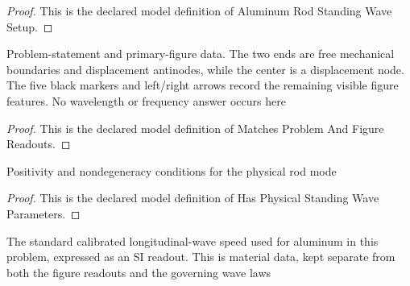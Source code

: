 \begin{proof}
  This is the declared model definition of Aluminum Rod Standing Wave Setup.
\end{proof}
\begin{definition}
  \label{def:physics:phyx-mini-0185:phyxminiproblems-problemphyxmini0185-matchesproblemandfigurereadouts}
  Problem-statement and primary-figure data. The two ends are free mechanical boundaries and displacement antinodes, while the center is a displacement node. The five black markers and left/right arrows record the remaining visible figure features. No wavelength or frequency answer occurs here
\end{definition}
\begin{proof}
  This is the declared model definition of Matches Problem And Figure Readouts.
\end{proof}
\begin{definition}
  \label{def:physics:phyx-mini-0185:phyxminiproblems-problemphyxmini0185-hasphysicalstandingwaveparameters}
  Positivity and nondegeneracy conditions for the physical rod mode
\end{definition}
\begin{proof}
  This is the declared model definition of Has Physical Standing Wave Parameters.
\end{proof}
\begin{definition}
  \label{def:physics:phyx-mini-0185:phyxminiproblems-problemphyxmini0185-matchesstandardaluminumlongitudinalspeed}
  The standard calibrated longitudinal-wave speed used for aluminum in this problem, expressed as an SI readout. This is material data, kept separate from both the figure readouts and the governing wave laws
\end{definition}
